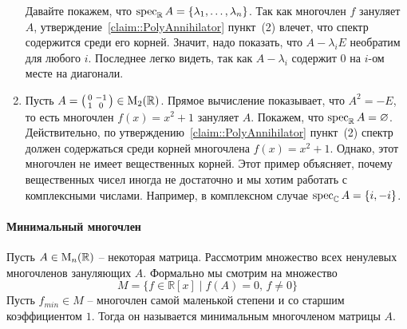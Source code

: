 \begin{enumerate}
Давайте покажем, что $\operatorname{spec}_\mathbb R A = \{\lambda_1,\ldots, \lambda_n\}$. Так как многочлен $f$ зануляет $A$, утверждение~\ref{claim::PolyAnnihilator} пункт~(2) влечет, что спектр содержится среди его корней. Значит, надо показать, что $A-\lambda_i E$ необратим для любого $i$. Последнее легко видеть, так как $A-\lambda_i$ содержит $0$ на $i$-ом месте на диагонали.


\item Пусть $A=\left(\begin{smallmatrix}{0}&{-1}\\{1}&{0}\end{smallmatrix}\right)\in\operatorname{M}_{2}(\mathbb R)$. Прямое вычисление показывает, что $A^2 = -E$, то есть многочлен $f(x) = x^2 + 1$ зануляет $A$. Покажем, что $\operatorname{spec}_\mathbb R A = \varnothing$. Действительно, по утверждению~\ref{claim::PolyAnnihilator} пункт~(2) спектр должен содержаться среди корней многочлена $f(x) = x^2 + 1$. Однако, этот многочлен не имеет вещественных корней. Этот пример объясняет, почему вещественных чисел иногда не достаточно и мы хотим работать с комплексными числами. Например, в комплексном случае $\operatorname{spec}_\mathbb C A = \{i, - i\}$.
\end{enumerate}



\paragraph{Минимальный многочлен}
Пусть $A\in\operatorname{M}_{n}(\mathbb R)$ -- некоторая матрица. Рассмотрим множество всех ненулевых многочленов зануляющих $A$. Формально мы смотрим на множество
\[
M = \{f\in\mathbb R[x]\mid f(A)=0,\,f\neq 0\}
\]
Пусть $f_{min}\in M$ -- многочлен самой маленькой степени и со старшим коэффициентом $1$. Тогда он называется минимальным многочленом матрицы $A$.

